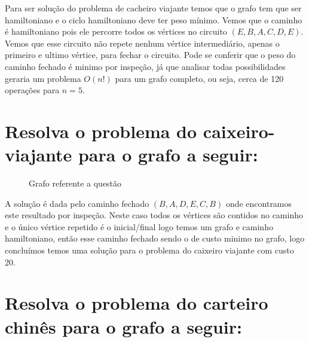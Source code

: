 \documentclass[a4paper,12pt]{article}
\begin{document}
	Para ser solução do problema de cacheiro viajante temos que o grafo tem que ser hamiltoniano e o ciclo hamiltoniano deve ter peso mínimo. Vemos que o caminho é hamiltoniano pois ele percorre todos os vértices no circuito $(E,B,A,C,D,E)$. Vemos que esse circuito não repete nenhum vértice intermediário, apenas o primeiro e ultimo vértice, para fechar o circuito. Pode se conferir que o peso do caminho fechado é minimo por inspeção, já que analisar todas possibilidades geraria um problema $O(n!)$ para um grafo completo, ou seja, cerca de 120 operações para $n = 5$.

\section{Resolva o problema do caixeiro-viajante para o grafo a seguir:}
	\begin{figure}[!ht]
		\centering
		\caption{Grafo referente a questão \thesection}
	\end{figure}

	A solução é dada pelo caminho fechado $(B,A,D,E,C,B)$ onde encontramos este resultado por inspeção. Neste caso todos os vértices são contidos no caminho e o único vértice repetido é o inicial/final logo temos um grafo e caminho hamiltoniano, então esse caminho fechado sendo o de custo minimo no grafo, logo concluímos temos uma solução para o problema do caixeiro viajante com custo 20.

\section{Resolva o problema do carteiro chinês para o grafo a seguir:}
\end{document}
